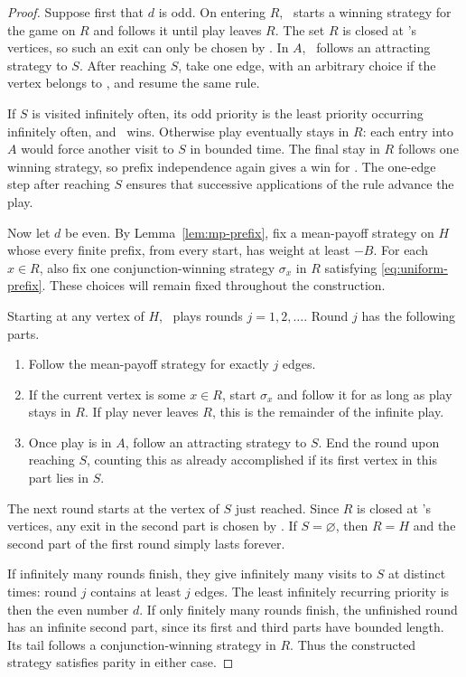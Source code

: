 \begin{proof}
Suppose first that $d$ is odd.  On entering $R$, \Min\ starts a winning
strategy for the game on $R$ and follows it until play leaves $R$.
The set $R$ is closed at \Min's vertices, so such an exit can only be
chosen by \Max.  In $A$, \Min\ follows an attracting strategy to $S$.
After reaching $S$, take one edge, with an arbitrary choice if the vertex
belongs to \Min, and resume the same rule.

If $S$ is visited infinitely often, its odd priority is the least
priority occurring infinitely often, and \Min\ wins.  Otherwise play
eventually stays in $R$: each entry into $A$ would force another visit to
$S$ in bounded time.  The final stay in $R$ follows one winning strategy,
so prefix independence again gives a win for \Min.  The one-edge step
after reaching $S$ ensures that successive applications of the rule
advance the play.

Now let $d$ be even.  By Lemma~\ref{lem:mp-prefix}, fix a mean-payoff
strategy on $H$ whose every finite prefix, from every start, has weight
at least $-B$.  For each $x\in R$, also fix one conjunction-winning
strategy $\sigma_x$ in $R$ satisfying \eqref{eq:uniform-prefix}.  These
choices will remain fixed throughout the construction.

Starting at any vertex of $H$, \Max\ plays rounds $j=1,2,\ldots$.
Round $j$ has the following parts.
\begin{enumerate}
\item Follow the mean-payoff strategy for exactly $j$ edges.
\item If the current vertex is some $x\in R$, start $\sigma_x$ and follow
it for as long as play stays in $R$.  If play never leaves $R$, this is
the remainder of the infinite play.
\item Once play is in $A$, follow an attracting strategy to $S$.
End the round upon reaching $S$, counting this as already accomplished
if its first vertex in this part lies in $S$.
\end{enumerate}
The next round starts at the vertex of $S$ just reached.  Since $R$ is
closed at \Max's vertices, any exit in the second part is chosen by
\Min.  If $S=\varnothing$, then $R=H$ and the second part of the first
round simply lasts forever.

If infinitely many rounds finish, they give infinitely many visits to
$S$ at distinct times: round $j$ contains at least $j$ edges.  The least
infinitely recurring priority is then the even number $d$.  If only
finitely many rounds finish, the unfinished round has an infinite
second part, since its first and third parts have bounded length.  Its
tail follows a conjunction-winning strategy in $R$.  Thus the constructed
strategy satisfies parity in either case.


\end{proof}
